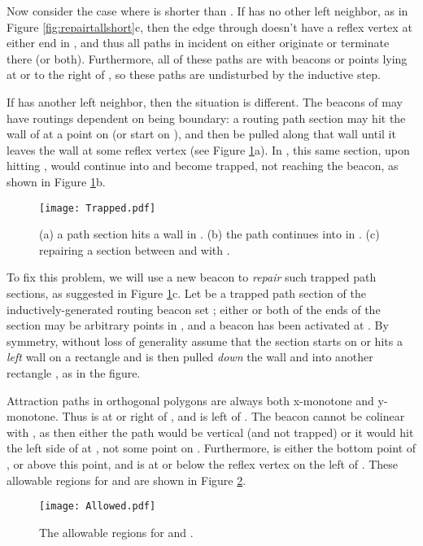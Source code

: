 \documentclass{article}
\begin{document}
	Now consider the case where  is shorter than . 
	If  has no other left neighbor, as in Figure \ref{fig:repairtallshort}c, 
	then the edge through  doesn't have a reflex
	vertex at either end in , and thus all paths in  
	incident on  either originate or terminate there (or both).
	Furthermore, all of these paths are with beacons or points
	lying at or to the right of , so these paths are undisturbed by the
	inductive step.
	
	If  has another left neighbor, then the situation is different.
	The beacons of  may have routings dependent on  being boundary: a
	routing path section may hit the wall of  at a point on  (or start
	on ), and then be pulled along that wall until it leaves the wall at some
	reflex vertex (see Figure \ref{fig:trap}a).  In , this same section, upon hitting , would
	continue into  and become trapped, not reaching the beacon, as shown in 
	Figure \ref{fig:trap}b.

	\begin{figure}[htbp] 
		\begin{center}
		    \texttt{[image: Trapped.pdf]} 
		\end{center}
		\caption{
		    (a) a path section hits a wall in .
		    (b) the path continues into  in .
		    (c) repairing a section between  and  with .
		}
		\label{fig:trap}
	\end{figure}

	To fix this problem, we will use a new beacon to \emph{repair} such trapped path
	sections, as suggested in Figure \ref{fig:trap}c.
	Let  be a trapped path section of the inductively-generated
	routing beacon set ; either or both of the ends of the section may be arbitrary
	points in , and a beacon has been activated at .
	By symmetry, without loss of generality assume that the section starts on or
	hits a \emph{left} wall on a rectangle  and is then pulled
	\emph{down} the wall and into another rectangle , as in the figure.
	
	Attraction paths in orthogonal polygons are always both x-monotone and
	y-monotone.
	Thus  is at or right of , and  is left of .
	The beacon  cannot be colinear with , as then either the path
	would be vertical (and not trapped) or it would hit the left side of 
	at , not some point on .
	Furthermore,  is either the bottom point  of , or above this
	point, and  is at or below the reflex vertex  on the left of .
	These allowable regions for  and  are shown in Figure
	\ref{fig:allowable}.

	\begin{figure}[htbp] 
		\begin{center}
			\texttt{[image: Allowed.pdf]}
		\end{center}
		\caption{
		    The allowable regions for  and .
		}
		\label{fig:allowable}
	\end{figure}
\end{document}
